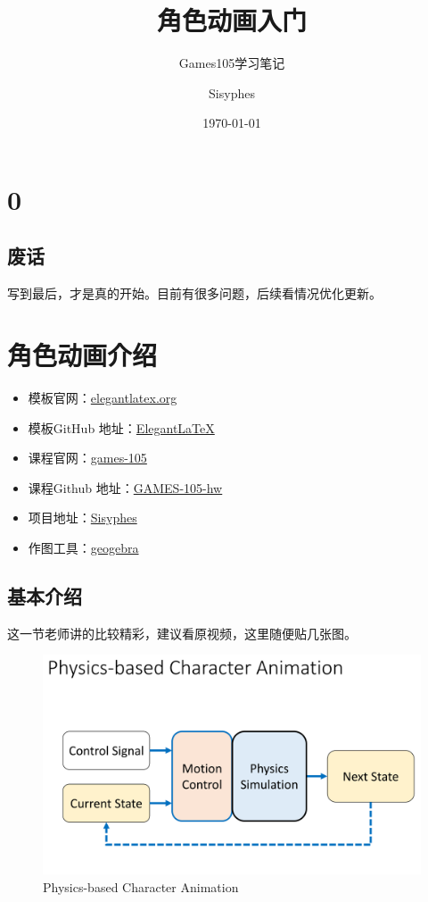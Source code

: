 \documentclass[lang=cn,newtx,10pt,scheme=chinese]{elegantbook}
\title{角色动画入门}
\subtitle{Games105学习笔记}
\author{Sisyphes}
\institute{家里蹲}
\date{\today}
\begin{document}
\maketitle
\frontmatter

\tableofcontents

\mainmatter

\chapter{0}
\section{废话}
写到最后，才是真的开始。目前有很多问题，后续看情况优化更新。

\chapter{角色动画介绍}

\begin{itemize}
  \item 模板官网：\href{https://elegantlatex.org/}{elegantlatex.org}
  \item 模板GitHub 地址：\href{https://github.com/ElegantLaTeX/}{ElegantLaTeX}
  \item 课程官网：\href{https://games-105.github.io/}{games-105}
  \item 课程Github 地址：\href{https://github.com/GAMES-105/GAMES-105}{GAMES-105-hw}
  \item 项目地址：\href{https://github.com/foocker}{Sisyphes}
  \item 作图工具：\href{https://www.geogebra.org/?lang=en}{geogebra}
\end{itemize}

\section{基本介绍}
这一节老师讲的比较精彩，建议看原视频，这里随便贴几张图。

\begin{figure}[htbp]
  \centering
  \includegraphics[totalheight=1.5in]{"./image/Physics-basedCharacterAnimation.png"}
  \caption{Physics-based Character Animation} \label{fig:Physics-basedCharacterAnimation}
\end{figure}
\end{document}
